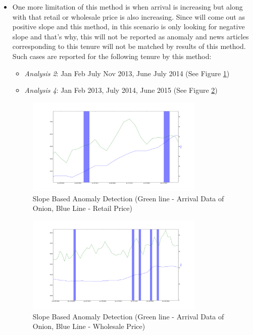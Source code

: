 \documentclass[a4paper,10pt]{report}
\begin{document}
\begin{itemize}
			\item One more limitation of this method is when arrival is increasing but along with that retail or wholesale price is also increasing. Since will come out as positive slope and this method, in this scenario is only looking for negative slope and that's why, this will not be reported as anomaly and news articles corresponding to this tenure will not be matched by results of this method.\\		
			
			Such cases are reported for the following tenure by this method:
			\begin{itemize}
				\item \textit{Analysis 2}: Jan Feb July Nov 2013, June July 2014 (See Figure \ref{fig:12123})
				\item \textit{Analysis 4}: Jan Feb 2013, July 2014, June 2015 (See Figure \ref{fig:12143})
			\end{itemize}
			
			\begin{figure}[H]
		    	\centering
  		    	\includegraphics[width=0.8\textwidth]{graphs/12123.png}
		    	\caption{Slope Based Anomaly Detection (Green line - Arrival Data of Onion, Blue Line - Retail Price)}
		    	\label{fig:12123}
			\end{figure}
			
			\begin{figure}[H]
		    	\centering
  		    	\includegraphics[width=0.8\textwidth]{graphs/12143.png}
		    	\caption{Slope Based Anomaly Detection (Green line - Arrival Data of Onion, Blue Line - Wholesale Price)}
		    	\label{fig:12143}
			\end{figure}
			

\end{itemize}
\end{document}
